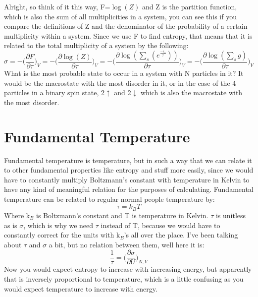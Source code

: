 \documentclass[arial]{article}
\begin{document}
Alright, so think of it this way, F=$\log(Z)$ and Z is the partition function, which is also the sum of all multiplicities in a system, you can see this if you compare the definitions of Z and the denominator of the probability of a certain multiplicity within a system. Since we use F to find entropy, that means that it is related to the total multiplicity of a system by the following:
\begin{equation}
\sigma =-\bigg(\frac{\partial F}{\partial \tau}\bigg)_V = -\bigg(\frac{\partial \log(Z)}{\partial \tau}\bigg)_V=-\bigg(\frac{\partial \log(\sum_s(e^\frac{-\epsilon_s}{\tau}))}{\partial \tau}\bigg)_V=-\bigg(\frac{\partial \log(\sum_sg)}{\partial \tau}\bigg)_V
\end{equation}
 What is the most probable state to occur in a system with N particles in it? It would be the macrostate with the most disorder in it, or in the case of the 4 particles in a binary spin state, 2$\uparrow$ and 2$\downarrow$ which is also the macrostate with the most disorder.
\section*{Fundamental Temperature}
Fundamental temperature is temperature, but in such a way that we can relate it to other fundamental properties like entropy and stuff more easily, since we would have to constantly multiply Boltzmann's constant with temperature in Kelvin to have any kind of meaningful relation for the purposes of calculating. Fundamental temperature can be related to regular normal people temperature by:
\begin{equation}
\tau = k_B T
\end{equation}
Where k$_B$ is Boltzmann's constant and T is temperature in Kelvin. $\tau$ is unitless as is $\sigma$, which is why we need $\tau$ instead of T, because we would have to constantly correct for the units with k$_B$'s all over the place. I've been talking about $\tau$ and $\sigma$ a bit, but no relation between them, well here it is:
\begin{equation}
\frac{1}{\tau}=\bigg(\frac{\partial \sigma}{\partial U}\bigg)_{N,V}
\end{equation}
Now you would expect entropy to increase with increasing energy, but apparently that is inversely proportional to temperature, which is a little confusing as you would expect temperature to increase with energy.
\end{document}
